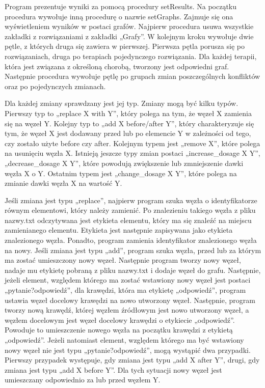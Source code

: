 Program prezentuje wyniki za pomocą procedury setResults. Na początku procedura wywołuje inną procedurę o nazwie setGraphs. Zajmuje się ona wyświetleniem wyników w postaci grafów. Najpierw procedura usuwa wszystkie zakładki z rozwiązaniami z zakładki „Grafy”. W kolejnym kroku wywołuje dwie pętle, z których druga się zawiera w pierwszej. Pierwsza pętla porusza się po rozwiązaniach, druga po terapiach pojedynczego rozwiązania. Dla każdej terapii, która jest związana z określoną chorobą, tworzony jest odpowiedni graf. Następnie procedura wywołuje pętlę po grupach zmian poszczególnych konfliktów oraz po pojedynczych zmianach. 

Dla każdej zmiany sprawdzany jest jej typ. Zmiany mogą być kilku typów. Pierwszy typ to „replace X with Y”, który polega na tym, że węzeł X zamienia się na węzeł Y. Kolejny typ to „add X before/after Y”, który charakteryzuje się tym, że węzeł X jest dodawany przed lub po elemencie Y w zależności od tego, czy zostało użyte before czy after. Kolejnym typem jest „remove X”, które polega na usunięciu węzła X. Istnieją jeszcze typy zmian postaci „increase\_dosage X Y”, „decrease\_dosage X Y”, które powodują zwiększenie lub zmniejszenie dawki węzła X o Y. Ostatnim typem jest „change\_dosage X Y”, które polega na zmianie dawki węzła X na wartość Y.  

Jeśli zmiana jest typu „replace”, najpierw program szuka węzła o identyfikatorze równym elementowi, który należy zamienić. Po znalezieniu takiego węzła z pliku nazwy.txt odczytywana jest etykieta elementu, który ma się znaleźć na miejscu zamienianego elementu. Etykieta jest następnie zapisywana jako etykieta znalezionego węzła. Ponadto, program zamienia identyfikator znalezionego węzła na nowy. Jeśli zmiana jest typu „add”, program szuka węzła, przed lub za którym ma zostać umieszczony nowy węzeł. Następnie program tworzy nowy węzeł, nadaje mu etykietę pobraną z pliku nazwy.txt i dodaje węzeł do grafu. Następnie, jeżeli element, względem którego ma zostać wstawiony nowy węzeł jest postaci „pytanie?odpowiedź”, dla krawędzi, która ma etykietę „odpowiedź”, program ustawia węzeł docelowy krawędzi na nowo utworzony węzeł. Następnie, program tworzy nową krawędź, której węzłem źródłowym jest nowo utworzony węzeł, a węzłem docelowym jest węzeł docelowy krawędzi o etykiecie „odpowiedź”. Powoduje to umieszczenie nowego węzła na początku krawędzi z etykietą „odpowiedź”. Jeżeli natomiast element, względem którego ma być wstawiony nowy węzeł nie jest typu „pytanie?odpowiedź”, mogą wystąpić dwa przypadki. Pierwszy przypadek występuje, gdy zmiana jest typu „add X after Y”, drugi, gdy zmiana jest typu „add X before Y”. Dla tych sytuacji nowy węzeł jest umieszczany odpowiednio za lub przed węzłem Y. 

